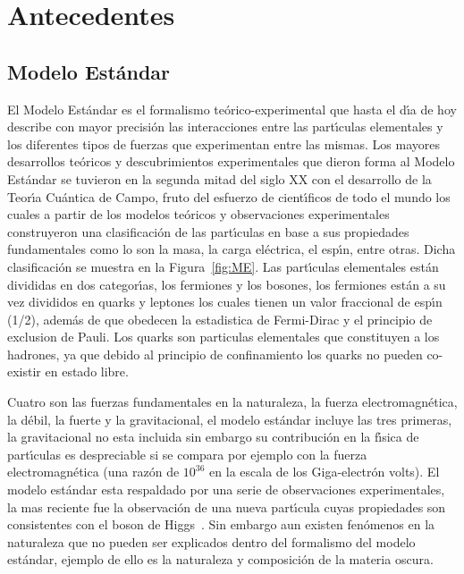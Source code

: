 \chapter{Antecedentes}

\section{Modelo Est\'andar}

El Modelo Est\'andar es el formalismo te\'orico-experimental que hasta el d\'{\i}a de hoy  describe con mayor precisi\'on las interacciones entre las part\'{\i}culas elementales y los diferentes tipos de fuerzas que experimentan entre las mismas. Los mayores desarrollos te\'oricos y descubrimientos experimentales que dieron forma al Modelo Est\'andar se tuvieron en la segunda mitad del siglo XX con el desarrollo de la Teor\'{\i}a Cu\'antica de Campo, fruto del esfuerzo de cient\'{\i}ficos de todo el mundo los cuales a partir de los modelos te\'oricos y observaciones experimentales construyeron una clasificaci\'on de las part\'{\i}culas en base a sus propiedades fundamentales como lo son la masa, la carga el\'ectrica, el esp\'{\i}n, entre otras. Dicha clasificaci\'on se muestra en la Figura~\ref{fig:ME}. Las part\'{\i}culas elementales est\'an divididas en dos categor\'{\i}as, los fermiones y los bosones, los fermiones est\'an a su vez divididos en quarks y leptones los cuales tienen un valor fraccional de esp\'{\i}n (1/2), adem\'as de que obedecen la estadistica de Fermi-Dirac y el principio de exclusion de Pauli. Los quarks son particulas elementales que constituyen a los hadrones, ya que debido al principio de confinamiento los quarks no pueden co-existir en estado libre.

Cuatro son las fuerzas fundamentales en la naturaleza, la fuerza electromagn\'etica, la d\'ebil, la fuerte y la gravitacional, el modelo est\'andar incluye las tres primeras, la gravitacional no esta incluida sin embargo su contribuci\'on en la f\'{\i}sica de part\'{\i}culas es despreciable si se compara por ejemplo con la fuerza electromagn\'etica (una raz\'on de $10^{36}$ en la escala de los Giga-electr\'on volts). El modelo est\'andar esta respaldado por una serie de observaciones experimentales, la mas reciente fue la observaci\'on de una nueva part\'{\i}cula cuyas propiedades son consistentes con el boson de Higgs~\cite{higgs}. Sin embargo aun existen fen\'omenos en la naturaleza que no pueden ser explicados dentro del formalismo del modelo est\'andar, ejemplo de ello es la naturaleza y composici\'on de la materia oscura.

